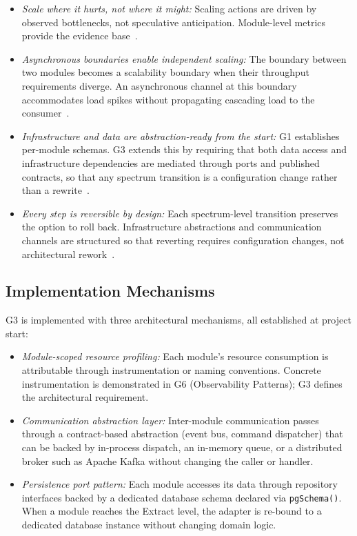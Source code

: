 \begin{itemize}[itemsep=8pt,topsep=2pt]
  \item \emph{Scale where it hurts, not where it might:}
  Scaling actions are driven by observed bottlenecks, not speculative anticipation. Module-level metrics provide the evidence base~\cite{FordParsons2017}.

  \item \emph{Asynchronous boundaries enable independent scaling:}
  The boundary between two modules becomes a scalability boundary when their throughput requirements diverge. An asynchronous channel at this boundary accommodates load spikes without propagating cascading load to the consumer~\cite{richardson2018microservices,newman2019monolith}.

  \item \emph{Infrastructure and data are abstraction-ready from the start:}
  G1 establishes per-module schemas. G3 extends this by requiring that both data access and infrastructure dependencies are mediated through ports and published contracts, so that any spectrum transition is a configuration change rather than a rewrite~\cite{cockburn2005hexagonal}.

  \item \emph{Every step is reversible by design:}
  Each spectrum-level transition preserves the option to roll back. Infrastructure abstractions and communication channels are structured so that reverting requires configuration changes, not architectural rework~\cite{FordParsons2017}.
\end{itemize}

\subsection*{Implementation Mechanisms}

G3 is implemented with three architectural mechanisms, all established at project start:

\begin{itemize}[itemsep=8pt,topsep=2pt]
  \item \emph{Module-scoped resource profiling:} Each module's resource consumption is attributable through instrumentation or naming conventions. Concrete instrumentation is demonstrated in G6 (Observability Patterns); G3 defines the architectural requirement.

  \item \emph{Communication abstraction layer:} Inter-module communication passes through a contract-based abstraction (event bus, command dispatcher) that can be backed by in-process dispatch, an in-memory queue, or a distributed broker such as Apache Kafka without changing the caller or handler.

  \item \emph{Persistence port pattern:} Each module accesses its data through repository interfaces backed by a dedicated database schema declared via \texttt{pgSchema()}. When a module reaches the Extract level, the adapter is re-bound to a dedicated database instance without changing domain logic.

\end{itemize}


